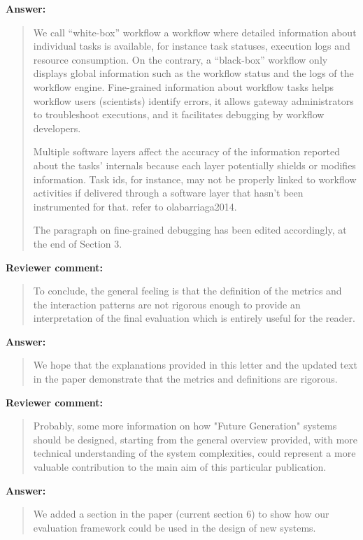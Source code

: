 \documentclass[a4]{article}
\newenvironment{review}%
{\textbf{Reviewer comment:}\begin{quote}}%
{\end{quote}}%
\newenvironment{answer}%
{\textbf{Answer:}\begin{small}\begin{quote}}%
{\end{quote}\end{small}}%
\newcommand{\todo}[1]{\color{red}#1\color{black}}
\begin{document}
\begin{answer}
  We call ``white-box'' workflow a workflow
  where detailed information about individual tasks is available,
  for instance task statuses, execution logs and resource
  consumption. On the contrary, a ``black-box'' workflow only
  displays global information such as the workflow status and the
  logs of the workflow engine. Fine-grained information about
  workflow tasks helps workflow users (scientists)
  identify errors, it allows gateway administrators to troubleshoot
  executions, and it facilitates debugging by workflow
  developers.
  
  Multiple software layers affect the accuracy of the information
  reported about the tasks' internals because each layer potentially
  shields or modifies information. Task ids, for instance, may not
  be properly linked to workflow activities if delivered through a
  software layer that hasn't been instrumented for that. \todo{refer
    to olabarriaga2014}.
  
  The paragraph on fine-grained debugging has been edited accordingly, at the end of Section 3.
\end{answer}

\begin{review}
To conclude, the general feeling is that the definition of the metrics and the interaction patterns are not rigorous enough to provide an interpretation of the final evaluation which is entirely useful for the reader.
\end{review}

\begin{answer}
We hope that the explanations provided in this letter and the updated text in the paper demonstrate that the metrics and definitions are rigorous.
\end{answer}

\begin{review}
 Probably, some more information on how "Future Generation" systems should be designed, starting from the general overview provided, with more technical understanding of the system complexities, could represent a more valuable contribution to the main aim of this particular publication.
\end{review}

\begin{answer}
  We added a section in the paper (current section 6) to show
  how our evaluation framework could be used in the design of new
  systems.
\end{answer}
\end{document}
